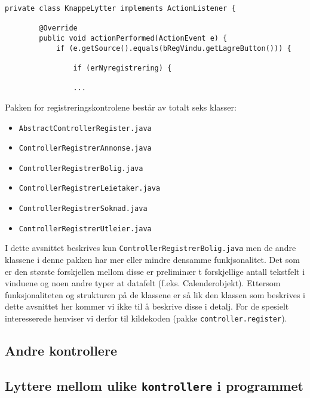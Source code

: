 \begin{lstlisting}[caption=\texttt{ControllerRegistrerBolig.java}: Uttdrag fra privat lytterklasse i kontrolleren.,label=kode:regex_bolig3]
    private class KnappeLytter implements ActionListener {

        @Override
        public void actionPerformed(ActionEvent e) {
            if (e.getSource().equals(bRegVindu.getLagreButton())) {

                if (erNyregistrering) {
                
                ...
\end{lstlisting}


Pakken for registreringskontrolene består av totalt seks klasser:
\begin{itemize}[noitemsep,nolistsep]
\item \texttt{AbstractControllerRegister.java}
\item \texttt{ControllerRegistrerAnnonse.java}
\item \texttt{ControllerRegistrerBolig.java}
\item \texttt{ControllerRegistrerLeietaker.java}
\item \texttt{ControllerRegistrerSoknad.java}
\item \texttt{ControllerRegistrerUtleier.java}
\end{itemize}

I dette avsnittet beskrives kun \texttt{ControllerRegistrerBolig.java} men de andre klassene i denne pakken har mer eller mindre densamme funkjsonalitet. Det som er den største forskjellen mellom disse er preliminær t forskjellige antall tekstfelt i vinduene og noen andre typer at datafelt (f.eks. Calenderobjekt). Ettersom funksjonaliteten og strukturen på de klassene er så lik den klassen som beskrives i dette avsnittet her kommer vi ikke til å beskrive disse i detalj. For de spesielt interesserede henviser vi derfor til kildekoden (pakke \texttt{controller.register}).



\subsection{Andre kontrollere}


\subsection{Lyttere mellom ulike \texttt{kontrollere} i programmet} \label{sec:kontrollerlyttere}

